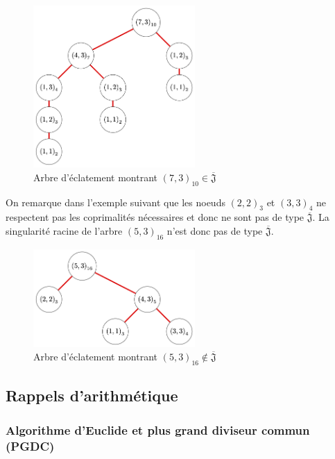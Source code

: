 \documentclass{article}
\newcommand{\J}{\mathfrak{J}}
\newcommand{\JS}{\overline{\J}}
\begin{document}
\begin{figure}[h]
    \caption{Arbre d'éclatement montrant ${(7, 3)}_{10} \in \JS$}
    \centering
    \includegraphics[width=0.55\textwidth]{10_7_3}
\end{figure}

On remarque dans l'exemple suivant que les noeuds ${(2, 2)}_3$ et ${(3, 3)}_4$ ne 
respectent pas les coprimalités nécessaires et donc ne sont pas de type $\JS$.
La singularité racine de l'arbre ${(5, 3)}_{16}$ n'est donc pas de type $\JS$.

\begin{figure}[h]
    \caption{Arbre d'éclatement montrant ${(5, 3)}_{16} \not \in \JS$}
    \centering
    \includegraphics[width=0.55\textwidth]{16_5_3}
\end{figure}

\newpage

\subsection{Rappels d'arithmétique}

\subsubsection{Algorithme d'Euclide et plus grand diviseur commun (PGDC)}
\end{document}
